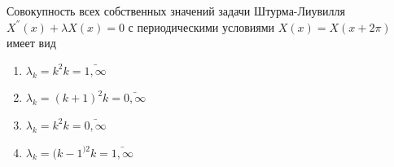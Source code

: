 Совокупность всех собственных значений задачи Штурма-Лиувилля \(X^{''}\left(x\right)+\lambda X\left(x\right)=0\)  с периодическими условиями \(X\left(x\right)=X(x+2\pi )\) имеет вид

\begin{enumerate}[label=\arabic*)]
    \item \(\lambda _k=k^2 k=\bar{1,\infty }\)
    \item \(\lambda _k=(k+1)^2 k=\bar{0,\infty }\)
    \item \(\lambda _k=k^2 k=\bar{0,\infty }\)
    \item \(\lambda _k=(k-1^{)2} k=\bar{1,\infty }\)
\end{enumerate}

